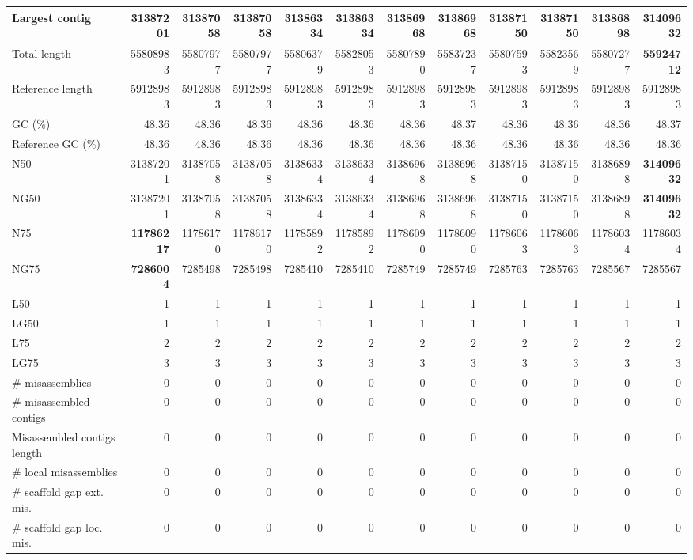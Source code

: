 \documentclass[12pt,a4paper]{article}
\begin{document}
\begin{table}[ht]
\begin{center}
\begin{tabular}{|l*{11}{|r}|}
Largest contig & 31387201 & 31387058 & 31387058 & 31386334 & 31386334 & 31386968 & 31386968 & 31387150 & 31387150 & 31386898 & {\bf 31409632} \\ \hline
Total length & 55808983 & 55807977 & 55807977 & 55806379 & 55828053 & 55807890 & 55837237 & 55807593 & 55823569 & 55807277 & {\bf 55924712} \\ \hline
Reference length & 59128983 & 59128983 & 59128983 & 59128983 & 59128983 & 59128983 & 59128983 & 59128983 & 59128983 & 59128983 & 59128983 \\ \hline
GC (\%) & 48.36 & 48.36 & 48.36 & 48.36 & 48.36 & 48.36 & 48.37 & 48.36 & 48.36 & 48.36 & 48.37 \\ \hline
Reference GC (\%) & 48.36 & 48.36 & 48.36 & 48.36 & 48.36 & 48.36 & 48.36 & 48.36 & 48.36 & 48.36 & 48.36 \\ \hline
N50 & 31387201 & 31387058 & 31387058 & 31386334 & 31386334 & 31386968 & 31386968 & 31387150 & 31387150 & 31386898 & {\bf 31409632} \\ \hline
NG50 & 31387201 & 31387058 & 31387058 & 31386334 & 31386334 & 31386968 & 31386968 & 31387150 & 31387150 & 31386898 & {\bf 31409632} \\ \hline
N75 & {\bf 11786217} & 11786170 & 11786170 & 11785892 & 11785892 & 11786090 & 11786090 & 11786063 & 11786063 & 11786034 & 11786034 \\ \hline
NG75 & {\bf 7286004} & 7285498 & 7285498 & 7285410 & 7285410 & 7285749 & 7285749 & 7285763 & 7285763 & 7285567 & 7285567 \\ \hline
L50 & 1 & 1 & 1 & 1 & 1 & 1 & 1 & 1 & 1 & 1 & 1 \\ \hline
LG50 & 1 & 1 & 1 & 1 & 1 & 1 & 1 & 1 & 1 & 1 & 1 \\ \hline
L75 & 2 & 2 & 2 & 2 & 2 & 2 & 2 & 2 & 2 & 2 & 2 \\ \hline
LG75 & 3 & 3 & 3 & 3 & 3 & 3 & 3 & 3 & 3 & 3 & 3 \\ \hline
\# misassemblies & 0 & 0 & 0 & 0 & 0 & 0 & 0 & 0 & 0 & 0 & 0 \\ \hline
\# misassembled contigs & 0 & 0 & 0 & 0 & 0 & 0 & 0 & 0 & 0 & 0 & 0 \\ \hline
Misassembled contigs length & 0 & 0 & 0 & 0 & 0 & 0 & 0 & 0 & 0 & 0 & 0 \\ \hline
\# local misassemblies & 0 & 0 & 0 & 0 & 0 & 0 & 0 & 0 & 0 & 0 & 0 \\ \hline
\# scaffold gap ext. mis. & 0 & 0 & 0 & 0 & 0 & 0 & 0 & 0 & 0 & 0 & 0 \\ \hline
\# scaffold gap loc. mis. & 0 & 0 & 0 & 0 & 0 & 0 & 0 & 0 & 0 & 0 & 0 \\ \hline

\end{tabular}
\end{center}
\end{table}
\end{document}
